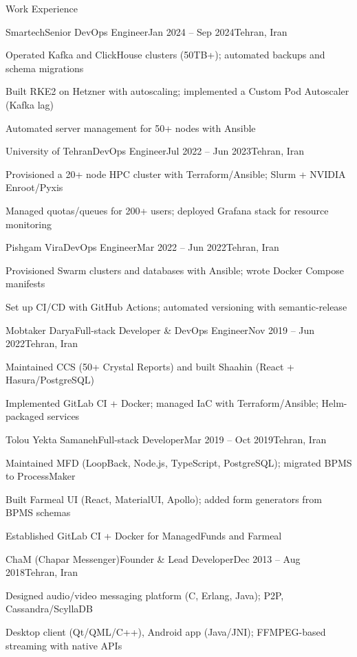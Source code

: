 \documentclass[]{main}
\begin{document}
\begin{section}{Work Experience}
\begin{subsection}{Smartech}{Senior DevOps Engineer}{Jan 2024 -- Sep 2024}{Tehran, Iran}
     \item Operated Kafka and ClickHouse clusters (50TB+); automated backups and schema migrations
     \item Built RKE2 on Hetzner with autoscaling; implemented a Custom Pod Autoscaler (Kafka lag)
     \item Automated server management for 50+ nodes with Ansible
 \end{subsection}
 \begin{subsection}{University of Tehran}{DevOps Engineer}{Jul 2022 -- Jun 2023}{Tehran, Iran}
     \item Provisioned a 20+ node HPC cluster with Terraform/Ansible; Slurm + NVIDIA Enroot/Pyxis
     \item Managed quotas/queues for 200+ users; deployed Grafana stack for resource monitoring
 \end{subsection}
 \begin{subsection}{Pishgam Vira}{DevOps Engineer}{Mar 2022 -- Jun 2022}{Tehran, Iran}
     \item Provisioned Swarm clusters and databases with Ansible; wrote Docker Compose manifests
     \item Set up CI/CD with GitHub Actions; automated versioning with semantic-release
 \end{subsection}
 \begin{subsection}{Mobtaker Darya}{Full-stack Developer \& DevOps Engineer}{Nov 2019 -- Jun 2022}{Tehran, Iran}
     \item Maintained CCS (50+ Crystal Reports) and built Shaahin (React + Hasura/PostgreSQL)
     \item Implemented GitLab CI + Docker; managed IaC with Terraform/Ansible; Helm-packaged services
 \end{subsection}
 \begin{subsection}{Tolou Yekta Samaneh}{Full-stack Developer}{Mar 2019 -- Oct 2019}{Tehran, Iran}
     \item Maintained MFD (LoopBack, Node.js, TypeScript, PostgreSQL); migrated BPMS to ProcessMaker
     \item Built Farmeal UI (React, MaterialUI, Apollo); added form generators from BPMS schemas
     \item Established GitLab CI + Docker for ManagedFunds and Farmeal
 \end{subsection}
 \begin{subsection}{ChaM (Chapar Messenger)}{Founder \& Lead Developer}{Dec 2013 -- Aug 2018}{Tehran, Iran}
     \item Designed audio/video messaging platform (C, Erlang, Java); P2P, Cassandra/ScyllaDB
     \item Desktop client (Qt/QML/C++), Android app (Java/JNI); FFMPEG-based streaming with native APIs
 \end{subsection}
\end{section}

\end{document}
